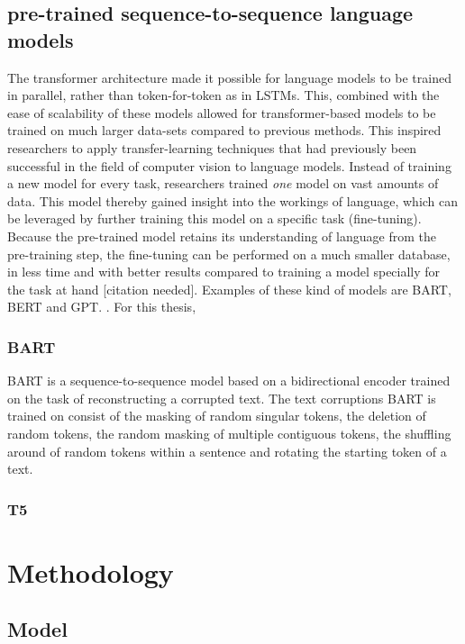\documentclass[twocolumn]{article}
\begin{document}
\subsection{pre-trained sequence-to-sequence language models}
The transformer architecture \parencite{DBLP:journals/corr/VaswaniSPUJGKP17} made it possible for language models to be trained in parallel, rather than token-for-token as in LSTMs. This, combined with the ease of scalability of these models allowed for transformer-based models to be trained on much larger data-sets compared to previous methods. This inspired researchers to apply transfer-learning techniques that had previously been successful in the field of computer vision \parencite{DBLP:journals/corr/YosinskiCBL14} to language models. Instead of training a new model for every task, researchers trained \textit{one} model on vast amounts of data. This model thereby gained insight into the workings of language, which can be leveraged by further training this model on a specific task (fine-tuning). Because the pre-trained model retains its understanding of language from the pre-training step, the fine-tuning can be performed on a much smaller database, in less time and with better results compared to training a model specially for the task at hand [citation needed]. Examples of these kind of models are BART, BERT and GPT. \parencite{DBLP:journals/corr/abs-1910-13461, BERT, Radford2019LanguageMA}.
For this thesis,
\subsubsection{BART}
BART \parencite{BART} is a sequence-to-sequence model based on a bidirectional encoder trained on the task of reconstructing a corrupted text. The text corruptions BART is trained on consist of the masking of random singular tokens, the deletion of random tokens, the random masking of multiple contiguous tokens, the shuffling around of random tokens within a sentence and rotating the starting token of a text. 
\subsubsection{T5}

\section{Methodology}
\subsection{Model}
\end{document}
